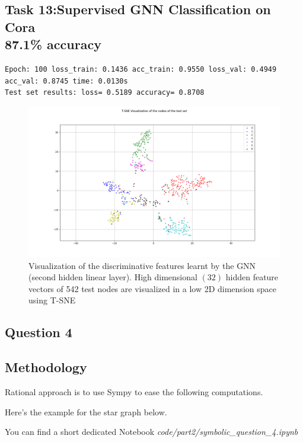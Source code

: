 \documentclass[a4paper]{article}
\begin{document}
\subsection*{Task 13:Supervised GNN Classification on Cora \\ 87.1\% accuracy}
\begin{verbatim}
Epoch: 100 loss_train: 0.1436 acc_train: 0.9550 loss_val: 0.4949 acc_val: 0.8745 time: 0.0130s
Test set results: loss= 0.5189 accuracy= 0.8708
\end{verbatim}


\begin{figure}[ht]
    \centering
    \includegraphics[width=1.\textwidth]{figures/tSNE_Cora.png}
    \caption{Visualization of the discriminative features learnt by the GNN (second hidden linear layer). 
    High dimensional $(32)$ hidden feature vectors of 542 test nodes are visualized in a low 2D dimension space using T-SNE}
    \label{fig:tsne_cora}
\end{figure}
\break
\subsection*{Question 4}
\subsection*{Methodology}

Rational approach is to use Sympy to ease the following computations.

Here's the example for the star graph below.

You can find a short dedicated Notebook 
\textit{code/part2/symbolic\_question\_4.ipynb}
\end{document}
